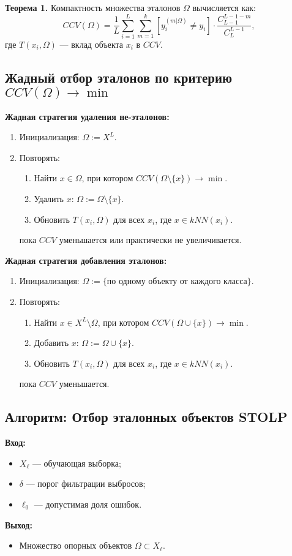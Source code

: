 \textbf{Теорема 1.} Компактность множества эталонов \( \Omega \) вычисляется как:
\[
CCV(\Omega) = \frac{1}{L} \sum_{i=1}^L \sum_{m=1}^k \left[ y_i^{(m|\Omega)} \neq y_i \right] \cdot \frac{C_{L-1}^{L-1-m}}{C_L^{L-1}},
\]
где \( T(x_i, \Omega) \) — вклад объекта \( x_i \) в \( CCV \).


\subsection*{Жадный отбор эталонов по критерию $CCV(\Omega) \to \min$}

\textbf{Жадная стратегия удаления не-эталонов:}
\begin{enumerate}
    \item Инициализация: $\Omega := X^L$.
    \item Повторять:
    \begin{enumerate}
        \item Найти $x \in \Omega$, при котором $CCV(\Omega \setminus \{x\}) \to \min$.
        \item Удалить $x$: $\Omega := \Omega \setminus \{x\}$.
        \item Обновить $T(x_i, \Omega)$ для всех $x_i$, где $x \in kNN(x_i)$.
    \end{enumerate}
    пока $CCV$ уменьшается или практически не увеличивается.
\end{enumerate}

\textbf{Жадная стратегия добавления эталонов:}
\begin{enumerate}
    \item Инициализация: $\Omega := \{\text{по одному объекту от каждого класса}\}$.
    \item Повторять:
    \begin{enumerate}
        \item Найти $x \in X^L \setminus \Omega$, при котором $CCV(\Omega \cup \{x\}) \to \min$.
        \item Добавить $x$: $\Omega := \Omega \cup \{x\}$.
        \item Обновить $T(x_i, \Omega)$ для всех $x_i$, где $x \in kNN(x_i)$.
    \end{enumerate}
    пока $CCV$ уменьшается.
\end{enumerate}

\subsection*{Алгоритм: Отбор эталонных объектов STOLP}
\textbf{Вход:} 
\begin{itemize}
    \item \( X_\ell \) — обучающая выборка;
    \item \( \delta \) — порог фильтрации выбросов;
    \item \( \ell_0 \) — допустимая доля ошибок.
\end{itemize}
\textbf{Выход:}
\begin{itemize}
    \item Множество опорных объектов \( \Omega \subset X_\ell \).
\end{itemize}

